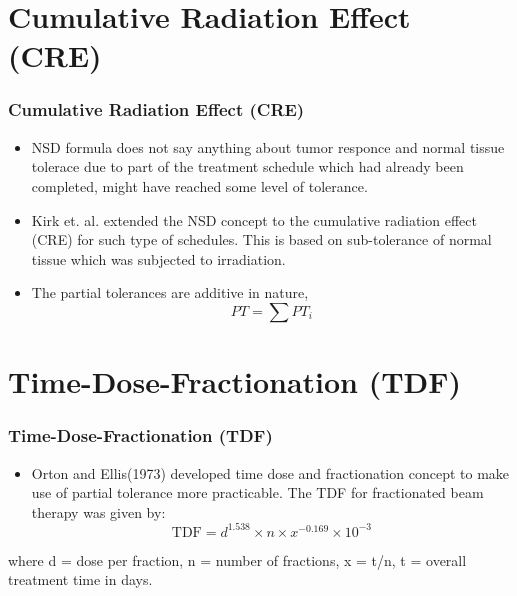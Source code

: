 \documentclass{beamer}
\begin{document}
\section{Cumulative Radiation Effect (CRE)}
\begin{frame}
  \frametitle{Cumulative Radiation Effect (CRE)}
  \begin{itemize}
    \item NSD formula does not say anything about tumor responce and normal tissue tolerace due to part of the treatment schedule which had already been completed, might have reached some level of tolerance. 
    \item Kirk et. al. extended the NSD concept to the cumulative radiation effect (CRE) for such type of schedules. This is based on sub-tolerance of normal tissue which was subjected to irradiation.
    \item The partial tolerances are additive in nature,
    $${PT} = \sum {PT}_i$$ 
  \end{itemize}
\end{frame}
\section{Time-Dose-Fractionation (TDF)}
\begin{frame}
  \frametitle{Time-Dose-Fractionation (TDF)}
  \begin{itemize}
    \item Orton and Ellis(1973) developed time dose and fractionation concept to make use of partial tolerance more practicable. The TDF for fractionated beam therapy was given by:
    $$\text{TDF} = d^{1.538} \times n \times x^{-0.169} \times 10^{-3}$$
  \end{itemize}
  where d = dose per fraction, n = number of fractions, x = t/n, t = overall treatment time in days.

\end{frame}


\end{document}
